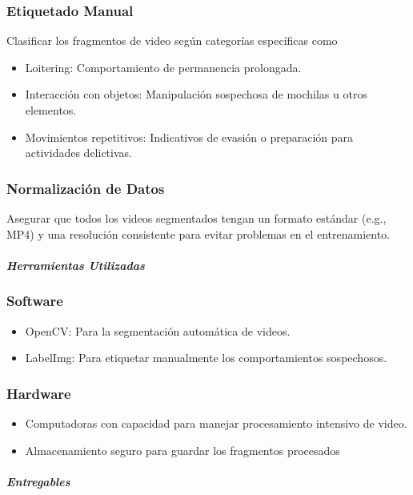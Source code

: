 \subsubsection{Etiquetado Manual}
Clasificar los fragmentos de video según categorías específicas como
\begin{itemize}
    \item Loitering: Comportamiento de permanencia prolongada.
    \item Interacción con objetos: Manipulación sospechosa de mochilas u otros elementos.
    \item Movimientos repetitivos: Indicativos de evasión o preparación para actividades delictivas.
\end{itemize}

\subsubsection{Normalización de Datos}
Asegurar que todos los videos segmentados tengan un formato estándar (e.g., MP4) y una resolución consistente para evitar problemas en el entrenamiento.


\paragraph{\textit{Herramientas Utilizadas}}

\subsubsection{Software}
\begin{itemize}
    \item OpenCV: Para la segmentación automática de videos.
    \item LabelImg: Para etiquetar manualmente los comportamientos sospechosos.
\end{itemize}

\subsubsection{Hardware}
\begin{itemize}
    \item Computadoras con capacidad para manejar procesamiento intensivo de video.
    \item Almacenamiento seguro para guardar los fragmentos procesados
\end{itemize}

\paragraph{\textit{Entregables}}

